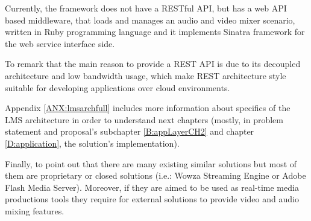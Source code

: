Currently, the framework does not have a RESTful API, but has a web API based middleware, that loads and manages an audio and video mixer scenario, written in Ruby programming language and it implements Sinatra framework for the web service interface side.

To remark that the main reason to provide a REST API is due to its decoupled architecture and low bandwidth usage, which make REST architecture style suitable for developing applications over cloud environments.

Appendix \ref{ANX:lmsarchfull} includes more information about specifics of the LMS architecture in order to understand next chapters (mostly, in problem statement and proposal's subchapter \ref{B:appLayerCH2} and chapter \ref{D:application}, the solution's implementation).

Finally, to point out that there are many existing similar solutions but most of them are proprietary or closed solutions (i.e.: Wowza Streaming Engine or Adobe Flash Media Server). Moreover, if they are aimed to be used as real-time media productions tools they require for external solutions to provide video and audio mixing features.
